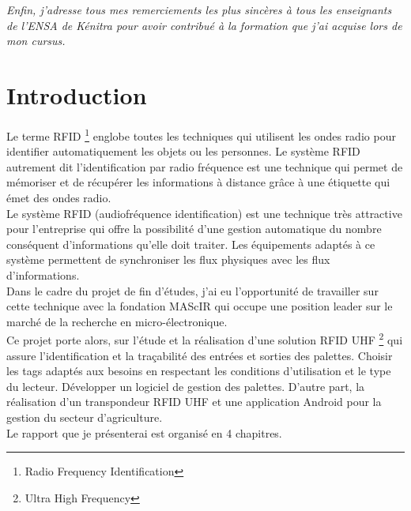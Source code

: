 \documentclass[11pt, a4paper, twoside]{book}
\begin{document}
\emph{Enfin, j’adresse tous mes remerciements les plus sincères à tous les enseignants de l’ENSA de Kénitra pour avoir contribué à la formation que j’ai acquise lors de mon cursus.}
\tableofcontents

\listoffigures

\listoftables

\chapter*{Introduction}
Le terme RFID \footnote{Radio Frequency Identification} englobe toutes les techniques qui utilisent les ondes radio pour identifier automatiquement les objets ou les personnes. Le système RFID autrement dit l'identification par radio fréquence est une technique qui permet de mémoriser et de récupérer les informations à distance grâce à une étiquette qui émet des ondes radio.\\

Le système RFID (audiofréquence identification) est une technique très attractive pour l'entreprise qui offre la possibilité d'une gestion automatique du nombre conséquent d'informations qu'elle doit traiter. Les équipements adaptés à ce système permettent de synchroniser les flux physiques avec les flux d'informations.\\

Dans le cadre du projet de fin d'études, j'ai eu l'opportunité de travailler sur cette technique avec la fondation MAScIR qui occupe une position leader sur le marché de la recherche en micro-électronique.\\

Ce projet porte alors, sur l'étude et la réalisation d’une solution RFID UHF \footnote{Ultra High Frequency} qui assure l’identification et la traçabilité des entrées et sorties des palettes. Choisir les tags adaptés aux besoins en respectant les conditions d’utilisation et le type du lecteur. Développer un logiciel de gestion des palettes. D’autre part, la réalisation d’un transpondeur RFID UHF et une application Android pour la gestion du secteur d'agriculture.\\

Le rapport que je présenterai est organisé en 4 chapitres.
\end{document}
